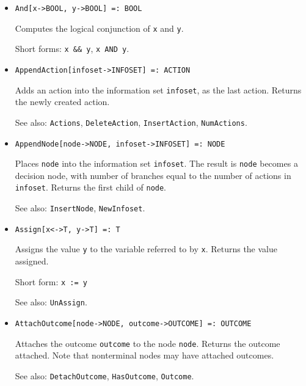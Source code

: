 \begin{itemize}
\item 
\protect \large \begin{verbatim}
And[x->BOOL, y->BOOL] =: BOOL
\end{verbatim} \normalsize

\bd
Computes the logical conjunction of \verb+x+ and \verb+y+.
\item
[Short forms:] \verb+x && y+, \verb+x AND y+.
\ed


\item
\protect \large \begin{verbatim}
AppendAction[infoset->INFOSET] =: ACTION
\end{verbatim}\normalsize

\bd
Adds an action into the information set \verb+infoset+,
as the last action.  Returns the newly created action.
\item
[See also:] {\tt Actions}, {\tt DeleteAction}, {\tt InsertAction},
{\tt NumActions}.
\ed


\item
\protect \large \begin{verbatim} 
AppendNode[node->NODE, infoset->INFOSET] =: NODE
\end{verbatim}\normalsize

\bd
Places \verb+node+ into the information set
\verb+infoset+.  The result is \verb+node+ becomes a decision node,
with number of branches equal to the number of actions in \verb+infoset+.
Returns the first child of \verb+node+.
\item
[See also:] {\tt InsertNode}, {\tt NewInfoset}.
\ed

\item 
\protect \large \begin{verbatim}
Assign[x<->T, y->T] =: T
\end{verbatim} \normalsize

\bd
Assigns the value \verb+y+ to the variable referred to by
\verb+x+.  Returns the value assigned.
\item
[Short form:] \verb+x := y+
\item
[See also:] {\tt UnAssign}.
\ed

\item
\protect \large \begin{verbatim} 
AttachOutcome[node->NODE, outcome->OUTCOME] =: OUTCOME
\end{verbatim}\normalsize

\bd
Attaches the outcome \verb+outcome+ to the node \verb+node+.
Returns the outcome attached.  Note that nonterminal nodes may have
attached outcomes.
\item
[See also:] {\tt DetachOutcome}, {\tt HasOutcome}, {\tt Outcome}.
\ed


\end{itemize}
